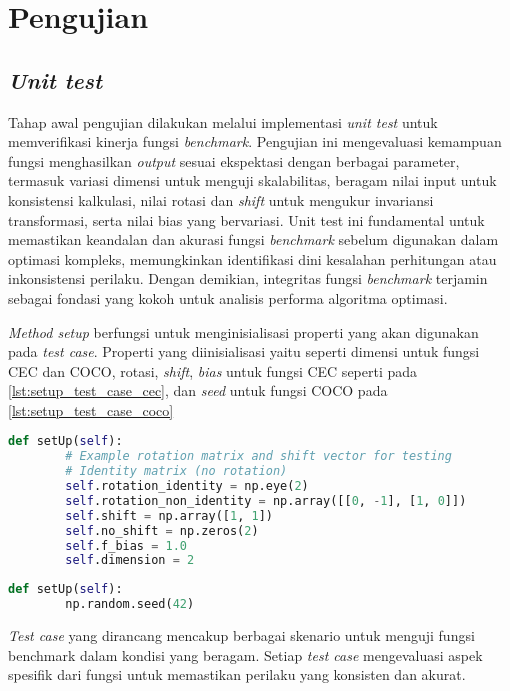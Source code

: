 \section{Pengujian}
\subsection{\textit{Unit test}}
Tahap awal pengujian dilakukan melalui implementasi \textit{unit test} untuk memverifikasi kinerja fungsi \textit{benchmark}. Pengujian ini mengevaluasi kemampuan fungsi menghasilkan \textit{output} sesuai ekspektasi dengan berbagai parameter, termasuk variasi dimensi untuk menguji skalabilitas, beragam nilai input untuk konsistensi kalkulasi, nilai rotasi dan \textit{shift} untuk mengukur invariansi transformasi, serta nilai bias yang bervariasi. Unit test ini fundamental untuk memastikan keandalan dan akurasi fungsi \textit{benchmark} sebelum digunakan dalam optimasi kompleks, memungkinkan identifikasi dini kesalahan perhitungan atau inkonsistensi perilaku. Dengan demikian, integritas fungsi \textit{benchmark} terjamin sebagai fondasi yang kokoh untuk analisis performa algoritma optimasi.

\textit{Method setup} berfungsi untuk menginisialisasi properti yang akan digunakan pada \textit{test case}. Properti yang diinisialisasi yaitu seperti dimensi untuk fungsi CEC dan COCO, rotasi, \textit{shift}, \textit{bias} untuk fungsi CEC seperti pada \cref{lst:setup_test_case_cec}, dan \textit{seed} untuk fungsi COCO pada \cref{lst:setup_test_case_coco}
\begin{lstlisting}[language=Python, caption=\textit{setup unit test} fungsi CEC, label=lst:setup_test_case_cec]
    def setUp(self):
        # Example rotation matrix and shift vector for testing
        # Identity matrix (no rotation)
        self.rotation_identity = np.eye(2)
        self.rotation_non_identity = np.array([[0, -1], [1, 0]])
        self.shift = np.array([1, 1])
        self.no_shift = np.zeros(2)
        self.f_bias = 1.0
        self.dimension = 2
\end{lstlisting}
\begin{lstlisting}[language=Python, caption=\textit{setup unit test} fungsi COCO, label=lst:setup_test_case_coco]
    def setUp(self):
        np.random.seed(42)
\end{lstlisting}
\textit{Test case} yang dirancang mencakup berbagai skenario untuk menguji fungsi benchmark dalam kondisi yang beragam. Setiap \textit{test case} mengevaluasi aspek spesifik dari fungsi untuk memastikan perilaku yang konsisten dan akurat.

